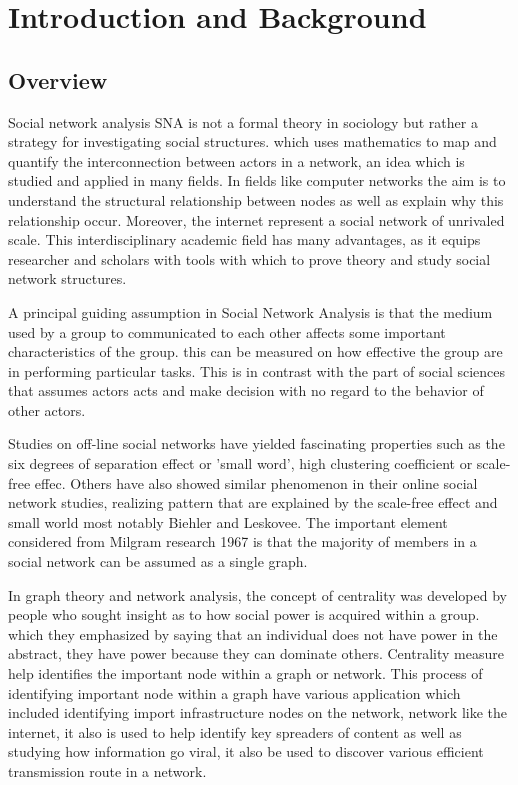 \chapter{Introduction and Background}


\section{Overview}
Social network analysis SNA is not a formal theory in sociology but rather a strategy for investigating social structures. which uses mathematics to map and quantify the interconnection between actors in a network, an idea which is studied and applied in many fields. In fields like computer networks the aim is to understand the structural relationship between nodes as well as explain why this relationship occur. Moreover, the internet represent a social network of unrivaled scale. This interdisciplinary academic field has many advantages, as it equips researcher and scholars with tools with which to prove theory and study social network structures.  

A principal guiding assumption in Social Network Analysis is that the medium used by  a group to communicated to each other affects some important characteristics of the group. this can be measured on how effective the group are in performing particular tasks\cite{scott2017social}. This is in contrast with the part of social sciences that assumes actors acts and make decision with no regard to the behavior of other actors. 

Studies on off-line social networks have yielded fascinating properties such as the six degrees of separation effect or 'small word'\cite{travers1967small}, high clustering coefficient\cite{newman2004analysis} or scale-free effec\cite{castellsInformationalism}. Others have also showed similar phenomenon in their online social network studies, realizing pattern that are explained by the scale-free effect and small world most notably Biehler and Leskovee\cite{leskovecPlanetary}. The important element considered from Milgram research 1967 is that the majority of members in a social network can be assumed as a single graph. 

In graph theory and network analysis, the concept of centrality was developed by people who sought insight as to how social power is acquired within a group. which they emphasized by saying that an individual does not have power in the abstract, they have power because they can dominate others. Centrality measure help identifies the important node within a graph or network.  This process of identifying important node within a graph have various application which included identifying import infrastructure nodes on the network, network like the internet, it also is used to help identify key spreaders of content as well as studying how information go viral, it also be used to discover various efficient transmission route in a network. 

